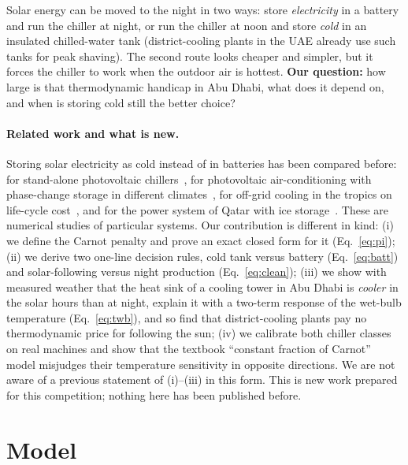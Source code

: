 \documentclass[10pt,a4paper]{article}
\begin{document}
Solar energy can be moved to the night in two ways: store \emph{electricity} in a battery and run the chiller at
night, or run the chiller at noon and store \emph{cold} in an insulated chilled-water tank (district-cooling plants in
the UAE already use such tanks for peak shaving). The second route looks cheaper and simpler, but it forces the
chiller to work when the outdoor air is hottest. \textbf{Our question:} how large is that thermodynamic handicap in
Abu Dhabi, what does it depend on, and when is storing cold still the better choice?

\paragraph{Related work and what is new.} Storing solar electricity as cold instead of in batteries has been compared
before: for stand-alone photovoltaic chillers~\cite{wang2020}, for photovoltaic air-conditioning with phase-change
storage in different climates~\cite{wangdennis}, for off-grid cooling in the tropics on life-cycle
cost~\cite{luerssen}, and for the power system of Qatar with ice storage~\cite{alaali}. These are numerical studies
of particular systems. Our contribution is different in kind:
(i) we define the Carnot penalty and prove an exact closed form for it (Eq.~\ref{eq:pi});
(ii) we derive two one-line decision rules, cold tank versus battery (Eq.~\ref{eq:batt}) and solar-following versus
night production (Eq.~\ref{eq:clean});
(iii) we show with measured weather that the heat sink of a cooling tower in Abu Dhabi is \emph{cooler} in the solar
hours than at night, explain it with a two-term response of the wet-bulb temperature (Eq.~\ref{eq:twb}), and so find
that district-cooling plants pay no thermodynamic price for following the sun;
(iv) we calibrate both chiller classes on \NMachines{} real machines and show that the textbook ``constant fraction
of Carnot'' model misjudges their temperature sensitivity in opposite directions.
We are not aware of a previous statement of (i)--(iii) in this form. This is new work prepared for this competition;
nothing here has been published before.

\section{Model}
\end{document}
